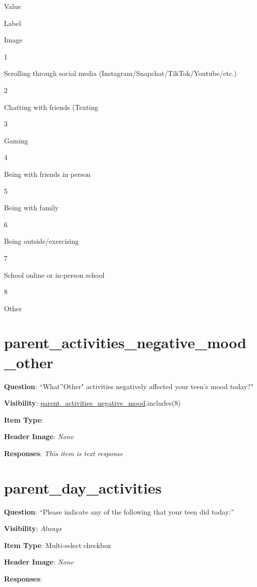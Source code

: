 \documentclass[]{book}
\begin{document}
Value

Label

Image

1

Scrolling through social media (Instagram/Snapchat/TikTok/Youtube/etc.)

2

Chatting with friends (Texting

3

Gaming

4

Being with friends in person

5

Being with family

6

Being outside/exercising

7

School online or in-person school

8

Other

\hypertarget{parent_activities_negative_mood_other}{%
\section{parent\_activities\_negative\_mood\_other}\label{parent_activities_negative_mood_other}}

\textbf{Question}: ``What''Other" activities negatively affected your teen's mood today?"

\textbf{Visibility}: \protect\hyperlink{parent_activities_negative_mood}{parent\_activities\_negative\_mood}.includes(8)

\textbf{Item Type}:

\textbf{Header Image}: \emph{None}

\textbf{Responses}: \emph{This item is text response}

\hypertarget{parent_day_activities}{%
\section{parent\_day\_activities}\label{parent_day_activities}}

\textbf{Question}: ``Please indicate any of the following that your teen did today:''

\textbf{Visibility}: \emph{Always}

\textbf{Item Type}: Multi-select checkbox

\textbf{Header Image}: \emph{None}

\textbf{Responses}:
\end{document}
